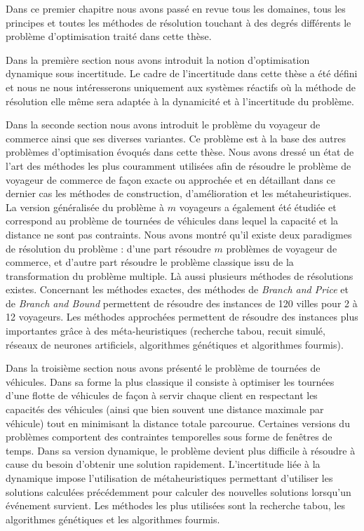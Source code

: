 Dans ce premier chapitre nous avons passé en revue tous les domaines, tous les principes et toutes les méthodes de résolution touchant à des degrés différents le problème d'optimisation traité dans cette thèse.

Dans la première section nous avons introduit la notion d'optimisation dynamique sous incertitude. Le cadre de l'incertitude dans cette thèse a été défini et nous ne nous intéresserons uniquement aux systèmes réactifs où la méthode de résolution elle même sera adaptée à la dynamicité et à l'incertitude du problème.

Dans la seconde section nous avons introduit le problème du voyageur de commerce ainsi que ses diverses variantes. Ce problème est à la base des autres problèmes d'optimisation évoqués dans cette thèse. Nous avons dressé un état de l'art des méthodes les plus couramment utilisées afin de résoudre le problème de voyageur de commerce de façon exacte ou approchée et en détaillant dans ce dernier cas les méthodes de construction, d'amélioration et les métaheuristiques. La version généralisée du problème à $m$ voyageurs a également été étudiée et correspond au problème de tournées de véhicules dans lequel la capacité et la distance ne sont pas contraints. Nous avons montré qu'il existe deux paradigmes de résolution du problème : d'une part résoudre $m$ problèmes de voyageur de commerce, et d'autre part résoudre le problème classique issu de la transformation du problème multiple. Là aussi plusieurs méthodes de résolutions existes. Concernant les méthodes exactes, des méthodes de \textit{Branch and Price} et de \textit{Branch and Bound} permettent de résoudre des instances de 120 villes pour 2 à 12 voyageurs. Les méthodes approchées permettent de résoudre des instances plus importantes grâce à des méta-heuristiques (recherche tabou, recuit simulé, réseaux de neurones artificiels, algorithmes génétiques et algorithmes fourmis). 

Dans la troisième section nous avons présenté le problème de tournées de véhicules. Dans sa forme la plus classique il consiste à optimiser les tournées d'une flotte de véhicules de façon à servir chaque client en respectant les capacités des véhicules (ainsi que bien souvent une distance maximale par véhicule) tout en minimisant la distance totale parcourue. Certaines versions du problèmes comportent des contraintes temporelles sous forme de fenêtres de temps. Dans sa version dynamique, le problème devient plus difficile à résoudre à cause du besoin d'obtenir une solution rapidement. L'incertitude liée à la dynamique impose l'utilisation de métaheuristiques permettant d'utiliser les solutions calculées précédemment pour calculer des nouvelles solutions lorsqu'un événement survient. Les méthodes les plus utilisées sont la recherche tabou, les algorithmes génétiques et les algorithmes fourmis.

